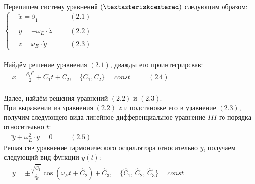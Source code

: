 \documentclass[oneside,final,14pt]{extarticle}
\begin{document}
	\noindent Перепишем систему уравнений $(\textasteriskcentered)$ следующим образом: \\
	
	\begin{math}
		\left\{
		\begin{aligned}
			& \ddot{x} = \beta_{1} \quad && (2.1) \\\\
			& \ddot{y} = -\omega_{E} \cdot \dot{z} \quad && (2.2) \\\\
			& \ddot{z} = \omega_{E} \cdot \dot{y} \quad && (2.3)
		\end{aligned}
		\right.
	\end{math} \\\\
	
	\noindent Найдём решение уравнения $(2.1)$, дважды его проинтегрировав: \\
	
	\begin{math}
		\begin{aligned}
			& x = \frac{\beta_{1}t^{2}}{2} + C_{1}t + C_{2}, \quad \{C_{1}, C_{2}\} = const \quad && (2.4)
		\end{aligned}
	\end{math} \\\\
	
	\noindent Далее, найдём решения уравнений $(2.2)$ и $(2.3)$. \\
	
	\noindent При выражении из уравнения $(2.2)$ $\dot{z}$ и подстановке его в уравнение $(2.3)$, получим следующего вида линейное дифференциальное уравнение $III$-го порядка относительно $t$: \\
	
	\begin{math}
		\begin{aligned}
			& \dddot{y} + \omega_{E}^{2} \cdot \dot{y} = 0 \quad && (2.5)
		\end{aligned}
	\end{math} \\
	
	\noindent Решая сие уравнение гармонического осциллятора относительно $\dot{y}$, получаем следующий вид функции $y(t)$: \\
	
	\begin{math}
		\begin{aligned}
			& y = \pm \frac{\sqrt{\widehat{C}_1}}{\omega_{E}^{2}} \cos{(\omega_{E}t + \widehat{C}_{2})} + \widehat{C}_{3}, \quad \{\widehat{C}_{1},\, \widehat{C}_{2},\, \widehat{C}_{3}\} = const
		\end{aligned}
	\end{math} \\\\
	
\end{document}
